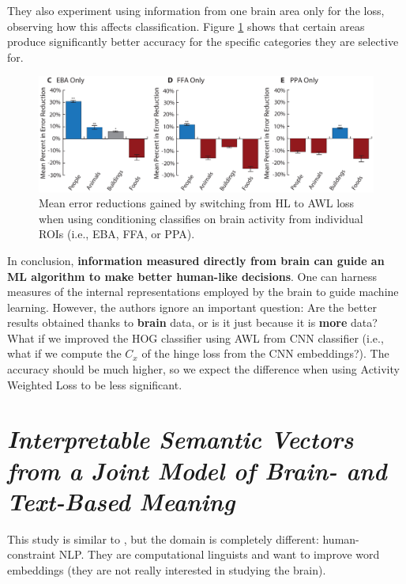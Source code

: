 They also experiment using information from one brain area only for the loss, observing how this affects classification. Figure \ref{fig:fong_2} shows that certain areas produce significantly better accuracy for the specific categories they are selective for.\\

\begin{figure}[!ht]
    \centering
    \captionsetup{width=.8\linewidth}
    \includegraphics[width=0.7\linewidth]{images/fong_2.png}
    \caption{Mean error reductions gained by switching from HL to AWL loss when using conditioning classifies on brain activity from individual ROIs (i.e., EBA, FFA, or PPA).}
    \label{fig:fong_2}
\end{figure}

In conclusion, \textbf{information measured directly from brain can guide an ML algorithm to make better human-like decisions}.
One can harness measures of the internal representations employed by the brain to guide machine learning.
However, the authors ignore an important question: Are the better results obtained thanks to \textbf{brain} data, or is it just because it is \textbf{more} data? What if we improved the HOG classifier using AWL from CNN classifier (i.e., what if we compute the $C_x$ of the hinge loss from the CNN embeddings?).
The accuracy should be much higher, so we expect the difference when using Activity Weighted Loss to be less significant.

\section[Interpretable Semantic Vectors from a Joint Model of Brain- and Text-Based Meaning]{\textit{Interpretable Semantic Vectors from a Joint Model of Brain- and Text-Based Meaning}\\ }

This study is similar to \cite{fong2017using}, but the domain is completely different: human-constraint NLP. They are computational linguists and want to improve word embeddings (they are not really interested in studying the brain).

